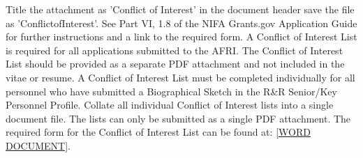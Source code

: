 \documentclass[12pt,letterpaper]{article}
\title{\ruleline{Conflict of Interest}}
\begin{document}
\maketitle
\linenumbers

Title the attachment as 'Conflict of Interest' in the document header save the
file as 'ConflictofInterest'. See Part VI, 1.8 of the NIFA Grants.gov
Application Guide for further instructions and a link to the required form. A
Conflict of Interest List is required for all applications submitted to the
AFRI. The Conflict of Interest List should be provided as a separate PDF
attachment and not included in the vitae or resume. A Conflict of Interest List
must be completed individually for all personnel who have submitted a
Biographical Sketch in the R\&R Senior/Key Personnel Profile. Collate all
individual Conflict of Interest lists into a single document file. The lists can
only be submitted as a single PDF attachment. The required form for the Conflict
of Interest List can be found at:
\href{www.nifa.usda.gov/funding/templates/conflict_of_interest.doc}{[WORD DOCUMENT]}.
\end{document}
